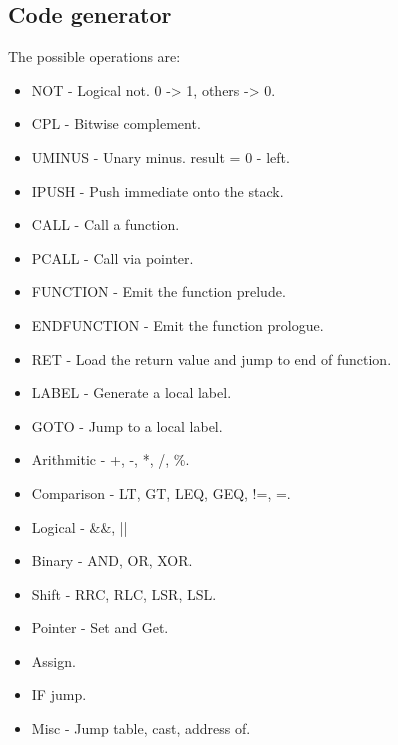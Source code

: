 \documentclass{article}
\begin{document}
\subsection{Code generator}
The possible operations are:
\begin{itemize}
	\item NOT - Logical not.  0 -> 1, others -> 0.
	\item CPL - Bitwise complement.
	\item UMINUS - Unary minus.  result = 0 - left.
	\item IPUSH - Push immediate onto the stack.
	\item CALL - Call a function.
	\item PCALL - Call via pointer.
	\item FUNCTION - Emit the function prelude.
	\item ENDFUNCTION - Emit the function prologue.
	\item RET - Load the return value and jump to end of function.
	\item LABEL - Generate a local label.
	\item GOTO - Jump to a local label.
	\item Arithmitic - +, -, *, /, \%.
	\item Comparison - LT, GT, LEQ, GEQ, !=, =.
	\item Logical - \&\&, ||
	\item Binary - AND, OR, XOR.
	\item Shift - RRC, RLC, LSR, LSL.
	\item Pointer - Set and Get.
	\item Assign.
	\item IF jump.
	\item Misc - Jump table, cast, address of.
\end{itemize}
\end{document}
